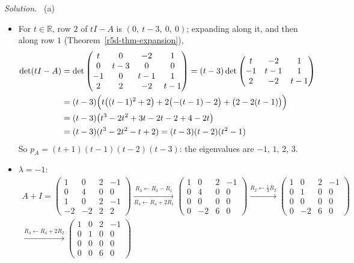 \documentclass[12pt]{article}
\newcommand{\R}{\mathbb R}
\theoremstyle{definition}
\newenvironment{solution}{\par\noindent\textit{Solution.}\ }{\par\smallskip}
\begin{document}
\begin{solution}
(a)
\begin{itemize}
\item For \(t\in\R\), row \(2\) of \(tI-A\) is \((0,\ t-3,\ 0,\ 0)\); expanding along it, and then along row \(1\)
(Theorem~\ref{r5d-thm-expansion}),
\[
\begin{aligned}
\det(tI-A)&=\det\begin{pmatrix}t&0&-2&1\\0&t-3&0&0\\-1&0&t-1&1\\2&2&-2&t-1\end{pmatrix}
=(t-3)\det\begin{pmatrix}t&-2&1\\-1&t-1&1\\2&-2&t-1\end{pmatrix}\\
&=(t-3)\Bigl(t\bigl((t-1)^2+2\bigr)+2\bigl(-(t-1)-2\bigr)+\bigl(2-2(t-1)\bigr)\Bigr)\\
&=(t-3)\bigl(t^3-2t^2+3t-2t-2+4-2t\bigr)\\
&=(t-3)(t^3-2t^2-t+2)=(t-3)(t-2)(t^2-1)
\end{aligned}
\]
So \(p_A=(t+1)(t-1)(t-2)(t-3)\): the eigenvalues are \(-1\), \(1\), \(2\), \(3\).
\item \(\lambda=-1\):
\[
\begin{gathered}
A+I=\begin{pmatrix}1&0&2&-1\\0&4&0&0\\1&0&2&-1\\-2&-2&2&2\end{pmatrix}
\xrightarrow[R_4\leftarrow R_4+2R_1]{R_3\leftarrow R_3-R_1}
\begin{pmatrix}1&0&2&-1\\0&4&0&0\\0&0&0&0\\0&-2&6&0\end{pmatrix}
\xrightarrow{R_2\leftarrow\frac14R_2}
\begin{pmatrix}1&0&2&-1\\0&1&0&0\\0&0&0&0\\0&-2&6&0\end{pmatrix}
\\
\xrightarrow{R_4\leftarrow R_4+2R_2}
\begin{pmatrix}1&0&2&-1\\0&1&0&0\\0&0&0&0\\0&0&6&0\end{pmatrix}

\end{gathered}\]
\end{itemize}
\end{solution}
\end{document}
